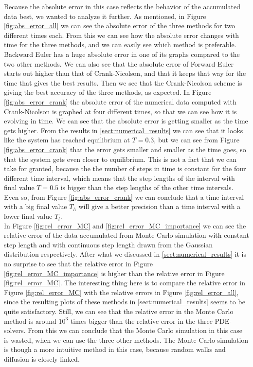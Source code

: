 \documentclass[12pt]{article}
\begin{document}
\begin{flushleft}
Because the absolute error in this case reflects the behavior of the accumulated data best, we wanted to analyze it further. As mentioned, in Figure \ref{fig:abs_error_all} we can see the absolute error of the three methods for two different times each. From this we can see how the absolute error changes with time for the three methods, and we can easily see which method is preferable. Backward Euler has a huge absolute error in one of its graphs compared to the two other methods. We can also see that the absolute error of Forward Euler starts out higher than that of Crank-Nicolson, and that it keeps that way for the time that gives the best results. Then we see that the Crank-Nicolson scheme is giving the best accuracy of the three methods, as expected. In Figure \ref{fig:abs_error_crank} the absolute error of the numerical data computed with Crank-Nicolson is graphed at four different times, so that we can see how it is evolving in time. We can see that the absolute error is getting smaller as the time gets higher. From the results in \ref{sect:numerical_results} we can see that it looks like the system has reached equilibrium at $T=0.3$, but we can see from Figure \ref{fig:abs_error_crank} that the error gets smaller and smaller as the time goes, so that the system gets even closer to equilibrium. This is not a fact that we can take for granted, because the the number of steps in time is constant for the four different time interval, which means that the step lengths of the interval with final value $T = 0.5$ is bigger than the step lengths of the other time intervals. Even so, from Figure \ref{fig:abs_error_crank} we can conclude that a time interval with a big final value $T_h$ will give a better precision than a time interval with a lower final value $T_l$.  \\

In Figure \ref{fig:rel_error_MC} and \ref{fig:rel_error_MC_importance} we can see the relative error of the data accumulated from Monte Carlo simulation with constant step length and with continuous step length drawn from the Gaussian distribution respectively. After what we discussed in \ref{sect:numerical_results} it is no surprise to see that the relative error in Figure \ref{fig:rel_error_MC_importance} is higher than the relative error in Figure \ref{fig:rel_error_MC}. The interesting thing here is to compare the relative error in Figure \ref{fig:rel_error_MC} with the relative errors in Figure \ref{fig:rel_error_all}, since the resulting plots of these methods in \ref{sect:numerical_results} seems to be quite satisfactory. Still, we can see that the relative error in the Monte Carlo method is around $10^3$ times bigger than the relative error in the three PDE-solvers. From this we can conclude that the Monte Carlo simulation in this case is wasted, when we can use the three other methods. The Monte Carlo simulation is though a more intuitive method in this case, because random walks and diffusion is closely linked.  




\end{flushleft}
\end{document}
